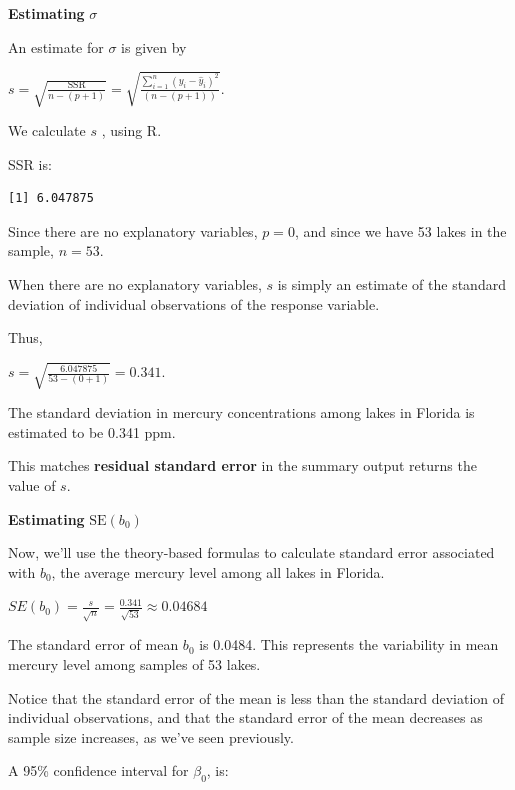 \documentclass[
  letterpaper,
  DIV=11,
  numbers=noendperiod]{scrreprt}
\newenvironment{Shaded}{\begin{snugshade}}{\end{snugshade}}
\newcommand{\DecValTok}[1]{\textcolor[rgb]{0.68,0.00,0.00}{#1}}
\newcommand{\FunctionTok}[1]{\textcolor[rgb]{0.28,0.35,0.67}{#1}}
\newcommand{\NormalTok}[1]{\textcolor[rgb]{0.00,0.23,0.31}{#1}}
\newcommand{\SpecialCharTok}[1]{\textcolor[rgb]{0.37,0.37,0.37}{#1}}
\begin{document}
\textbf{Estimating} \(\sigma\)

An estimate for \(\sigma\) is given by

\(s =\sqrt{\frac{\text{SSR}}{n-(p+1)}} = \sqrt{\frac{\displaystyle\sum_{i=1}^n(y_i-\hat{y}_i)^2}{(n-(p+1))}}\).

We calculate \(s\) , using R.

SSR is:

\begin{Shaded}
\end{Shaded}

\begin{verbatim}
[1] 6.047875
\end{verbatim}

Since there are no explanatory variables, \(p=0\), and since we have 53
lakes in the sample, \(n=53\).

When there are no explanatory variables, \(s\) is simply an estimate of
the standard deviation of individual observations of the response
variable.

Thus,

\(s =\sqrt{\frac{6.047875}{53-(0+1)}} = 0.341\).

The standard deviation in mercury concentrations among lakes in Florida
is estimated to be 0.341 ppm.

This matches \textbf{residual standard error} in the summary output
returns the value of \(s\).

\textbf{Estimating} \(\text{SE}(b_0)\)

Now, we'll use the theory-based formulas to calculate standard error
associated with \(b_0\), the average mercury level among all lakes in
Florida.

\(SE(b_0)=\frac{s}{\sqrt{n}}=\frac{0.341}{\sqrt{53}}\approx0.04684\)

The standard error of mean \(b_0\) is 0.0484. This represents the
variability in mean mercury level among samples of 53 lakes.

Notice that the standard error of the mean is less than the standard
deviation of individual observations, and that the standard error of the
mean decreases as sample size increases, as we've seen previously.

A 95\% confidence interval for \(\beta_0\), is:
\end{document}
